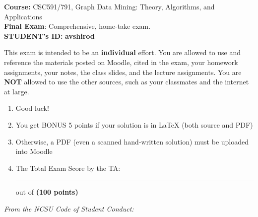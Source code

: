 \documentclass{article}%
\begin{document}
\begin{flushleft}
\textbf{Course:} CSC591/791, Graph Data Mining: Theory, Algorithms, and Applications\\
\textbf{Final Exam}: Comprehensive, home-take exam.\\
\textbf{STUDENT's ID:} \textbf{avshirod} %
\end{flushleft}


\noindent{\hrulefill}

\bigskip
This exam is intended to be an \textbf{individual} effort.  You are allowed to use and reference the materials posted on Moodle, cited in the exam, your homework assignments, your notes, the class slides, and the lecture assignments. You are \textbf{NOT} allowed to use the other sources, such as your classmates and the internet at large.

\begin{center}
\begin{enumerate}
	\item Good luck!
	\item You get BONUS 5 points if your solution is in LaTeX (both source and PDF)
	\item Otherwise, a PDF (even a scanned hand-written solution) must be uploaded into Moodle
	\item The Total Exam Score by the TA:  \rule{0.5 in}{1 pt} out of \textbf{(100 points)}
\end{enumerate}
\end{center}

\noindent{\hrulefill}

\bigskip
\textit{From the NCSU Code of Student Conduct:}
\end{document}
